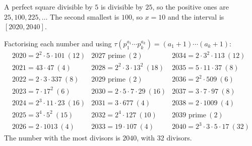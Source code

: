 A perfect square divisible by $5$ is divisible by $25$, so the positive ones are $25,100,225,\dots$ The second smallest is $100$, so $x=10$ and the interval is $[2020,2040]$.

Factorising each number and using $\tau\left(p_1^{a_1}\cdots p_k^{a_k}\right)=(a_1+1)\cdots(a_k+1)$:
\[\begin{array}{lll}
2020=2^2\cdot5\cdot101\ (12) & 2027\text{ prime}\ (2) & 2034=2\cdot3^2\cdot113\ (12)\\
2021=43\cdot47\ (4) & 2028=2^2\cdot3\cdot13^2\ (18) & 2035=5\cdot11\cdot37\ (8)\\
2022=2\cdot3\cdot337\ (8) & 2029\text{ prime}\ (2) & 2036=2^2\cdot509\ (6)\\
2023=7\cdot17^2\ (6) & 2030=2\cdot5\cdot7\cdot29\ (16) & 2037=3\cdot7\cdot97\ (8)\\
2024=2^3\cdot11\cdot23\ (16) & 2031=3\cdot677\ (4) & 2038=2\cdot1009\ (4)\\
2025=3^4\cdot5^2\ (15) & 2032=2^4\cdot127\ (10) & 2039\text{ prime}\ (2)\\
2026=2\cdot1013\ (4) & 2033=19\cdot107\ (4) & 2040=2^3\cdot3\cdot5\cdot17\ (32)
\end{array}\]
The number with the most divisors is $\boxed{2040}$, with $32$ divisors.
